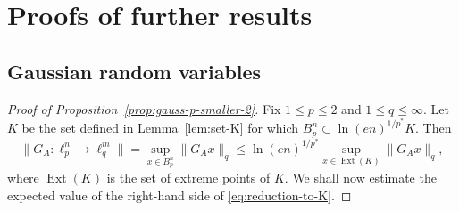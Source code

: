 \documentclass[a4paper]{amsart}
\theoremstyle{definition}
\theoremstyle{remark}
\numberwithin{equation}{section}
\newcommand*{\Ext}{\operatorname{Ext}} %
\begin{document}
%
\section{Proofs of further results}
\label{sec:particular-ranges}
%



%
\subsection{Gaussian random variables}
\label{sec:gaussian-rvs}
%

\begin{proof}[Proof of Proposition~\ref{prop:gauss-p-smaller-2}]
Fix $1\leq p\leq 2$ and $1\leq q\leq \infty$.
Let $K$ be the set defined in Lemma~\ref{lem:set-K} for which $B_p^n\subset \ln(en)^{1/p^*} K$.
Then
\begin{equation}
\label{eq:reduction-to-K}
\|G_A \colon \ell^n_p\to \ell^m_q\|
=  \sup_{x\in B_p^n} \|G_A x\|_q
\leq  \ln(en)^{1/p^*}\! \sup_{x\in \Ext (K)}\! \|G_A x\|_q,
\end{equation}
where  $\Ext(K)$ is the set of extreme points of $K$.
We shall now estimate the expected value of the right-hand side of \eqref{eq:reduction-to-K}.


\end{proof}
\end{document}
